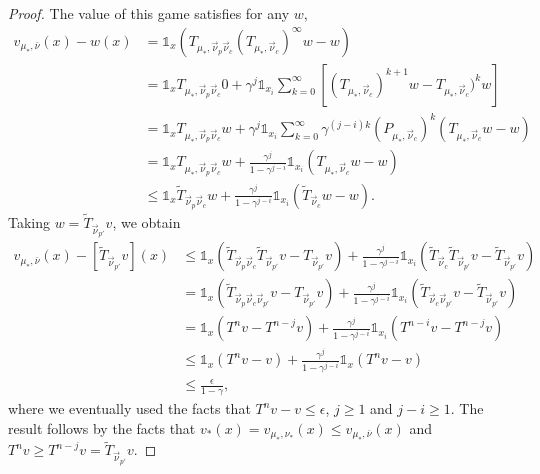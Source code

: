 \documentclass{article}
\def\1{{\mathds 1}}
\begin{document}
\begin{proof}
  The value of this game satisfies for any $w$,
  \begin{align}
    v_{\mu_*,\bar\nu}(x) - w(x)& = \1_x (T_{\mu_*,\vec\nu_p\vec\nu_c} (T_{\mu_*,\vec\nu_c})^\infty w - w)\\
    & = \1_x  T_{\mu_*,\vec\nu_p\vec\nu_c} 0 + \gamma^{j} \1_{x_i} \sum_{k=0}^{\infty} [(T_{\mu_*,\vec\nu_c})^{k+1} w - T_{\mu_*,\vec\nu_c})^k w] \\
    & = \1_x  T_{\mu_*,\vec\nu_p\vec\nu_c} w + \gamma^{j} \1_{x_i} \sum_{k=0}^{\infty} \gamma^{(j-i)k}(P_{\mu_*,\vec\nu_c})^k (T_{\mu_*,\vec\nu_c} w -  w)  \\
    &=\1_x  T_{\mu_*,\vec\nu_p\vec\nu_c} w + \frac{\gamma^{j}}{1-\gamma^{j-i}}\1_{x_i} (T_{\mu_*,\vec\nu_c} w -  w)  \\
    &\le \1_x  \tilde T_{\vec\nu_p\vec\nu_c} w + \frac{\gamma^{j}}{1-\gamma^{j-i}}\1_{x_i} (\tilde T_{\vec\nu_c} w -  w).
  \end{align}
  Taking $w = \tilde T_{\vec\nu_{p'}}v$, we obtain
  \begin{align}
    v_{\mu_*,\bar\nu}(x) - [ \tilde T_{\vec\nu_{p'}}v](x) & \le \1_x  (\tilde T_{\vec\nu_p\vec\nu_c} \tilde T_{\vec\nu_{p'}}v-T_{\vec\nu_{p'}}v) + \frac{\gamma^{j} }{1-\gamma^{j-i}}\1_{x_i} ( \tilde T_{\vec\nu_c} \tilde T_{\vec\nu_{p'}}v - \tilde T_{\vec\nu_{p'}} v )\\
    & = \1_x  (\tilde T_{\vec\nu_p\vec\nu_c\vec\nu_{p'}}v - T_{\vec\nu_{p'}}v)+ \frac{\gamma^{j} }{1-\gamma^{j-i}} \1_{x_i}(\tilde T_{\vec\nu_c\vec\nu_{p'}}v -  \tilde T_{\vec\nu_{p'}} v ) \\
    & = \1_x (T^nv - T^{n-j}v) + \frac{\gamma^{j}}{1-\gamma^{j-i}}  \1_{x_i} (T^{n-i}v -  T^{n-j}v ) \\
    & \le \1_x (T^nv - v) + \frac{\gamma^{j}}{1-\gamma^{j-i}}  \1_x (T^n v - v) \\
    & \le \frac{\epsilon}{1-\gamma},
  \end{align}
  where we eventually used the facts that $T^nv - v \le \epsilon$, $j \ge 1$ and $j-i \ge 1$.
The result follows by the facts that $v_*(x) = v_{\mu_*,\nu_*}(x) \le v_{\mu_*,\bar\nu}(x)$ and $T^n v \ge T^{n-j}v = \tilde T_{\vec\nu_{p'}}v$.
\end{proof}
\end{document}
